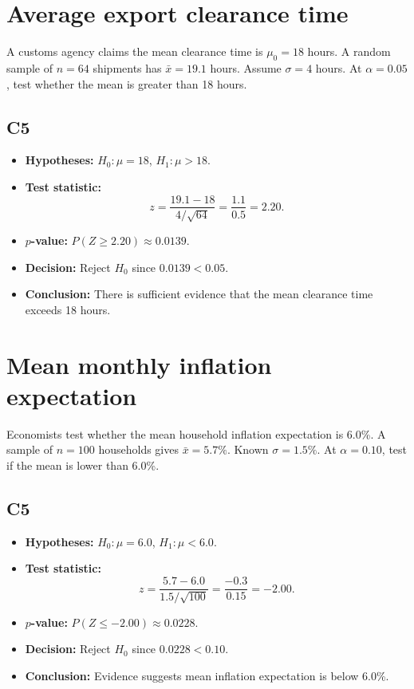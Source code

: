 \begin{ExamProblems}

\item
\section{Average export clearance time}
A customs agency claims the mean clearance time is \(\mu_0=18\) hours. A random sample of \(n=64\) shipments has \(\bar x=19.1\) hours. Assume \(\sigma=4\) hours. At \(\alpha=0.05\), test whether the mean is greater than 18 hours.

\subsection*{C5}
\begin{itemize}
    \item \textbf{Hypotheses:} \(H_0\colon \mu=18\), \(H_1\colon \mu>18\).
    \item \textbf{Test statistic:}
    \[
    z=\frac{19.1-18}{4/\sqrt{64}}=\frac{1.1}{0.5}=2.20.
    \]
    \item \textbf{\(p\)-value:} \(P(Z\ge 2.20)\approx 0.0139\).
    \item \textbf{Decision:} Reject \(H_0\) since \(0.0139<0.05\).
    \item \textbf{Conclusion:} There is sufficient evidence that the mean clearance time exceeds 18 hours.
\end{itemize}

\item
\section{Mean monthly inflation expectation}
Economists test whether the mean household inflation expectation is 6.0\%. A sample of \(n=100\) households gives \(\bar x=5.7\%\). Known \(\sigma=1.5\%\). At \(\alpha=0.10\), test if the mean is lower than 6.0\%.

\subsection*{C5}
\begin{itemize}
    \item \textbf{Hypotheses:} \(H_0\colon \mu=6.0\), \(H_1\colon \mu<6.0\).
    \item \textbf{Test statistic:}
    \[
    z=\frac{5.7-6.0}{1.5/\sqrt{100}}=\frac{-0.3}{0.15}=-2.00.
    \]
    \item \textbf{\(p\)-value:} \(P(Z\le -2.00)\approx 0.0228\).
    \item \textbf{Decision:} Reject \(H_0\) since \(0.0228<0.10\).
    \item \textbf{Conclusion:} Evidence suggests mean inflation expectation is below 6.0\%.
\end{itemize}


\end{ExamProblems}
